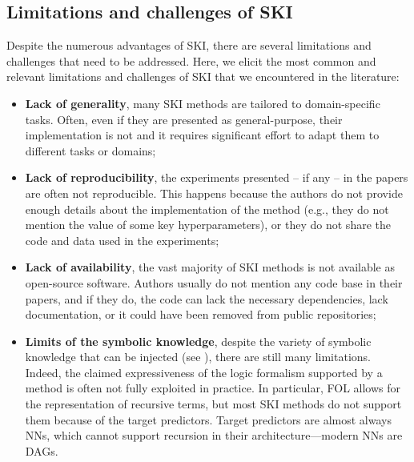 \subsection[Limitations and challenges of SKI]{Limitations and challenges of \Gls{SKI}}\label{subsec:limitations-and-challenges-of-ski}
%
Despite the numerous advantages of \gls{SKI}, there are several limitations and challenges that need to be addressed.
%
Here, we elicit the most common and relevant limitations and challenges of \gls{SKI} that we encountered in the literature:
%
\begin{itemize}
    \item \textbf{Lack of generality}, many \gls{SKI} methods are tailored to domain-specific tasks.
    Often, even if they are presented as general-purpose, their implementation is not and it requires significant effort to adapt them to different tasks or domains;
    \item \textbf{Lack of reproducibility}, the experiments presented -- if any -- in the papers are often not reproducible.
    This happens because the authors do not provide enough details about the implementation of the method (e.g., they do not mention the value of some key hyperparameters), or they do not share the code and data used in the experiments;
    \item \textbf{Lack of availability}, the vast majority of \gls{SKI} methods is not available as open-source software.
    Authors usually do not mention any code base in their papers, and if they do, the code can lack the necessary dependencies, lack documentation, or it could have been removed from public repositories;
    \item \textbf{Limits of the symbolic knowledge}, despite the variety of symbolic knowledge that can be injected (see ), there are still many limitations.
    Indeed, the claimed expressiveness of the logic formalism supported by a method is often not fully exploited in practice.
    In particular, \gls{FOL} allows for the representation of recursive terms, but most \gls{SKI} methods do not support them because of the target predictors.
    Target predictors are almost always \glspl{NN}, which cannot support recursion in their architecture---modern \glspl{NN} are \glspl{DAG}.
\end{itemize}

